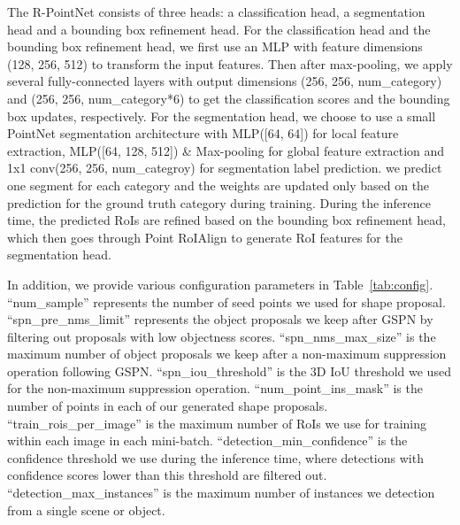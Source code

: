 \documentclass[10pt,twocolumn,letterpaper]{article}
\begin{document}
The R-PointNet consists of three heads: a classification head, a segmentation head and a bounding box refinement head. For the classification head and the bounding box refinement head, we first use an MLP with feature dimensions (128, 256, 512) to transform the input features. Then after max-pooling, we apply several fully-connected layers with output dimensions (256, 256, num\_category) and (256, 256, num\_category*6) to get the classification scores and the bounding box updates, respectively. For the segmentation head, we choose to use a small PointNet segmentation architecture with MLP([64, 64]) for local feature extraction, MLP([64, 128, 512]) \& Max-pooling for global feature extraction and 1x1 conv(256, 256, num\_categroy) for segmentation label prediction. we predict one segment for each category and the weights are updated only based on the prediction for the ground truth category during training. During the inference time, the predicted RoIs are refined based on the bounding box refinement head, which then goes through Point RoIAlign to generate RoI features for the segmentation head.

In addition, we provide various configuration parameters in Table~\ref{tab:config}. ``num\_sample'' represents the number of seed points we used for shape proposal. ``spn\_pre\_nms\_limit'' represents the object proposals we keep after GSPN by filtering out proposals with low objectness scores. ``spn\_nms\_max\_size'' is the maximum number of object proposals we keep after a non-maximum suppression operation following GSPN. ``spn\_iou\_threshold'' is the 3D IoU threshold we used for the non-maximum suppression operation. ``num\_point\_ins\_mask'' is the number of points in each of our generated shape proposals. ``train\_rois\_per\_image'' is the maximum number of RoIs we use for training within each image in each mini-batch. ``detection\_min\_confidence'' is the confidence threshold we use during the inference time, where detections with confidence scores lower than this threshold are filtered out. ``detection\_max\_instances'' is the maximum number of instances we detection from a single scene or object. 
\end{document}
